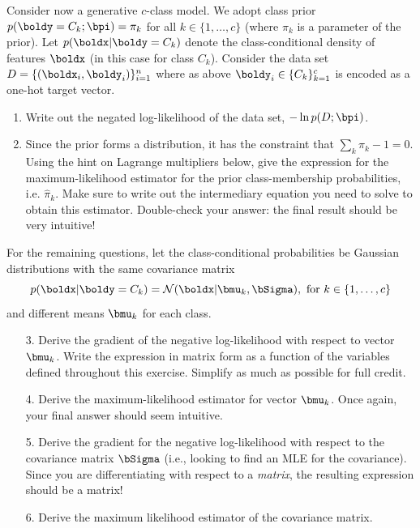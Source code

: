 \documentclass[submit]{harvardml}
\begin{document}
\begin{problem}

  Consider now a generative $c$-class model.  We adopt class prior
  $p(\boldy = C_k; \bpi) = \pi_k$ for all $k \in \{1, \ldots, c\}$
(where $\pi_k$ is a parameter of the prior).
%
Let  $p(\boldx|\boldy=C_k)$ denote
the class-conditional density of features $\boldx$ (in this
case for class $C_k$). Consider the data set $D = \{(\boldx_i,
\boldy_i)\}_{i=1}^n$ where as above $\boldy_i \in \{C_k\}_{k=1}^c$ is
encoded as a one-hot target vector. 
%
\begin{enumerate}
  \item Write out the negated log-likelihood of the data set,
    $-\ln p(D ; \bpi)$.
%
  \item Since the prior forms a distribution, it has the constraint that
    $\sum_k\pi_k - 1 = 0$.  Using the hint on
Lagrange multipliers below, give the
    expression for the maximum-likelihood estimator for the prior
    class-membership probabilities, i.e.
    $\hat \pi_k.$
    Make sure to write out the intermediary equation you need
    to solve to obtain this estimator. Double-check your answer: the final
    result should be very intuitive!
\end{enumerate}

    For the remaining questions, let the 
    class-conditional probabilities be Gaussian distributions with 
the same covariance matrix
    $$p(\boldx | \boldy = C_k) = \mathcal{N}(\boldx |  \bmu_k, \bSigma), \text{\ for\ }k \in \{1,\ldots, c\}$$
%
and different means $\bmu_k$ for each class.
%
    \begin{enumerate}
  \item[3.] Derive the gradient of the negative log-likelihood with respect to vector $\bmu_k$.
    Write the expression in matrix form as a function of the variables defined
    throughout this exercise. Simplify as much as possible for full credit.
  \item[4.] Derive the maximum-likelihood estimator for vector $\bmu_k$. Once
    again, your final answer should seem intuitive.
  \item[5.] Derive the gradient for the negative log-likelihood with respect to the
    covariance matrix $\bSigma$ (i.e., looking
to find an MLE for the covariance). 
Since you are differentiating with respect to a
    \emph{matrix}, the resulting expression should be a matrix!
%
  \item[6.] Derive the maximum likelihood estimator of the covariance matrix.
\end{enumerate}


\end{problem}
\end{document}
